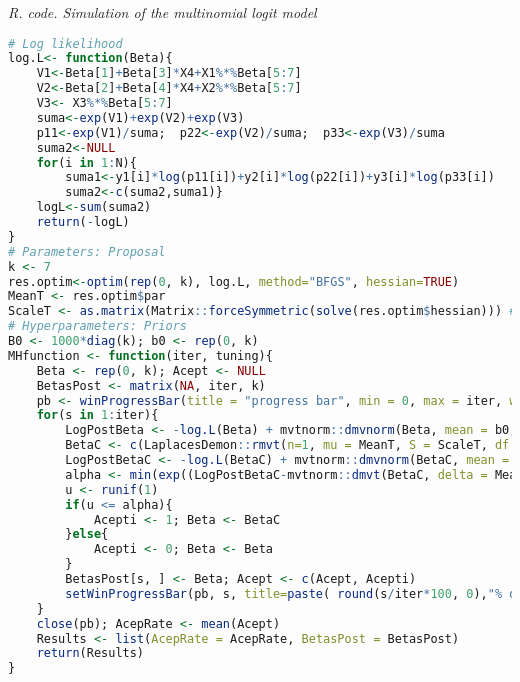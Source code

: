 \begin{tcolorbox}[enhanced,width=4.67in,center upper,
	fontupper=\large\bfseries,drop shadow southwest,sharp corners]
	\textit{R. code. Simulation of the multinomial logit model}
	\begin{VF}
		\begin{lstlisting}[language=R]		
# Log likelihood
log.L<- function(Beta){
	V1<-Beta[1]+Beta[3]*X4+X1%*%Beta[5:7]
	V2<-Beta[2]+Beta[4]*X4+X2%*%Beta[5:7]
	V3<- X3%*%Beta[5:7]
	suma<-exp(V1)+exp(V2)+exp(V3)
	p11<-exp(V1)/suma; 	p22<-exp(V2)/suma; 	p33<-exp(V3)/suma
	suma2<-NULL
	for(i in 1:N){
		suma1<-y1[i]*log(p11[i])+y2[i]*log(p22[i])+y3[i]*log(p33[i])
		suma2<-c(suma2,suma1)}
	logL<-sum(suma2)
	return(-logL)
}
# Parameters: Proposal
k <- 7
res.optim<-optim(rep(0, k), log.L, method="BFGS", hessian=TRUE)
MeanT <- res.optim$par
ScaleT <- as.matrix(Matrix::forceSymmetric(solve(res.optim$hessian))) # Force this matrix to be symmetric
# Hyperparameters: Priors
B0 <- 1000*diag(k); b0 <- rep(0, k)
MHfunction <- function(iter, tuning){
	Beta <- rep(0, k); Acept <- NULL 
	BetasPost <- matrix(NA, iter, k)
	pb <- winProgressBar(title = "progress bar", min = 0, max = iter, width = 300)
	for(s in 1:iter){
		LogPostBeta <- -log.L(Beta) + mvtnorm::dmvnorm(Beta, mean = b0, sigma = B0, log = TRUE)
		BetaC <- c(LaplacesDemon::rmvt(n=1, mu = MeanT, S = ScaleT, df = tuning))
		LogPostBetaC <- -log.L(BetaC) + mvtnorm::dmvnorm(BetaC, mean = b0, sigma = B0, log = TRUE)
		alpha <- min(exp((LogPostBetaC-mvtnorm::dmvt(BetaC, delta = MeanT, sigma = ScaleT, df = tuning, log = TRUE))-(LogPostBeta-mvtnorm::dmvt(Beta, delta = MeanT, sigma = ScaleT, df = tuning, log = TRUE))) ,1)
		u <- runif(1)
		if(u <= alpha){
			Acepti <- 1; Beta <- BetaC
		}else{
			Acepti <- 0; Beta <- Beta
		}
		BetasPost[s, ] <- Beta; Acept <- c(Acept, Acepti)
		setWinProgressBar(pb, s, title=paste( round(s/iter*100, 0),"% done"))
	}
	close(pb); AcepRate <- mean(Acept)
	Results <- list(AcepRate = AcepRate, BetasPost = BetasPost)
	return(Results)
}
\end{lstlisting}
	\end{VF}
\end{tcolorbox} 


